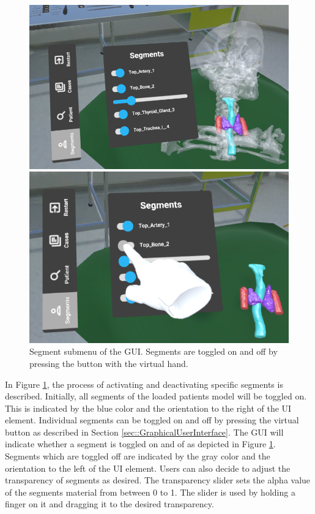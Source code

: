 \begin{figure}[ht]
  \centering
  \begin{minipage}{.5\textwidth}
    \centering
    \includegraphics[width=0.95\linewidth]{images/implementation/features/visualization/segments_1.png}
  \end{minipage}%
  \begin{minipage}{.5\textwidth}
    \centering
    \includegraphics[width=0.915\linewidth]{images/implementation/features/visualization/segments_2.png}
  \end{minipage}
  \caption{\label{fig::Segmentation}Segment submenu of the GUI. Segments are toggled on and off by pressing the button with the virtual hand.}
\end{figure}

In Figure \ref{fig::Segmentation}, the process of activating and deactivating specific segments is described.
Initially, all segments of the loaded patients model will be toggled on.
This is indicated by the blue color and the orientation to the right of the UI element.
Individual segments can be toggled on and off by pressing the virtual button as described in Section \ref{sec::GraphicalUserInterface}.
The GUI will indicate whether a segment is toggled on and of as depicted in Figure \ref{fig::Segmentation}.
Segments which are toggled off are indicated by the gray color and the orientation to the left of the UI element.
Users can also decide to adjust the transparency of segments as desired.
The transparency slider sets the alpha value of the segments material from between 0 to 1.
The slider is used by holding a finger on it and dragging it to the desired transparency.

